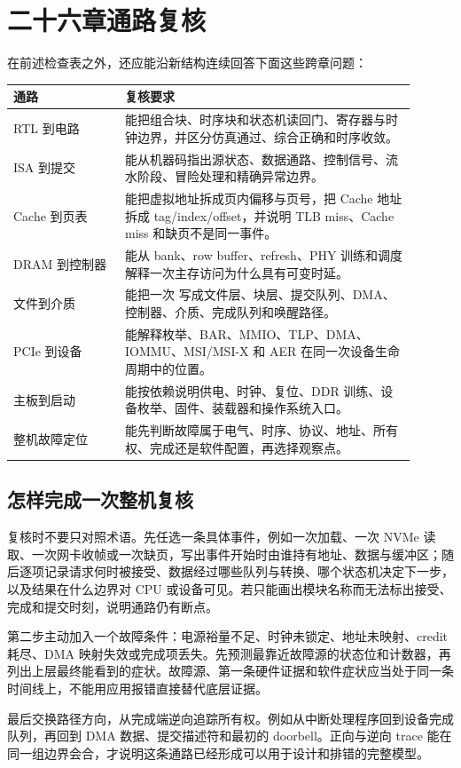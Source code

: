 

\section*{二十六章通路复核}

在前述检查表之外，还应能沿新结构连续回答下面这些跨章问题：

\begin{longtable}{L{0.25\linewidth}L{0.65\linewidth}}
\toprule
通路 & 复核要求 \\
\midrule
RTL 到电路 & 能把组合块、时序块和状态机读回门、寄存器与时钟边界，并区分仿真通过、综合正确和时序收敛。 \\\tablerowrule
ISA 到提交 & 能从机器码指出源状态、数据通路、控制信号、流水阶段、冒险处理和精确异常边界。 \\\tablerowrule
Cache 到页表 & 能把虚拟地址拆成页内偏移与页号，把 Cache 地址拆成 tag/index/offset，并说明 TLB miss、Cache miss 和缺页不是同一事件。 \\\tablerowrule
DRAM 到控制器 & 能从 bank、row buffer、refresh、PHY 训练和调度解释一次主存访问为什么具有可变时延。 \\\tablerowrule
文件到介质 & 能把一次  写成文件层、块层、提交队列、DMA、控制器、介质、完成队列和唤醒路径。 \\\tablerowrule
PCIe 到设备 & 能解释枚举、BAR、MMIO、TLP、DMA、IOMMU、MSI/MSI-X 和 AER 在同一次设备生命周期中的位置。 \\\tablerowrule
主板到启动 & 能按依赖说明供电、时钟、复位、DDR 训练、设备枚举、固件、装载器和操作系统入口。 \\\tablerowrule
整机故障定位 & 能先判断故障属于电气、时序、协议、地址、所有权、完成还是软件配置，再选择观察点。 \\
\bottomrule
\end{longtable}

\subsection*{怎样完成一次整机复核}

复核时不要只对照术语。先任选一条具体事件，例如一次加载、一次 NVMe 读取、一次网卡收帧或一次缺页，写出事件开始时由谁持有地址、数据与缓冲区；随后逐项记录请求何时被接受、数据经过哪些队列与转换、哪个状态机决定下一步，以及结果在什么边界对 CPU 或设备可见。若只能画出模块名称而无法标出接受、完成和提交时刻，说明通路仍有断点。

第二步主动加入一个故障条件：电源裕量不足、时钟未锁定、地址未映射、credit 耗尽、DMA 映射失效或完成项丢失。先预测最靠近故障源的状态位和计数器，再列出上层最终能看到的症状。故障源、第一条硬件证据和软件症状应当处于同一条时间线上，不能用应用报错直接替代底层证据。

最后交换路径方向，从完成端逆向追踪所有权。例如从中断处理程序回到设备完成队列，再回到 DMA 数据、提交描述符和最初的 doorbell。正向与逆向 trace 能在同一组边界会合，才说明这条通路已经形成可以用于设计和排错的完整模型。
